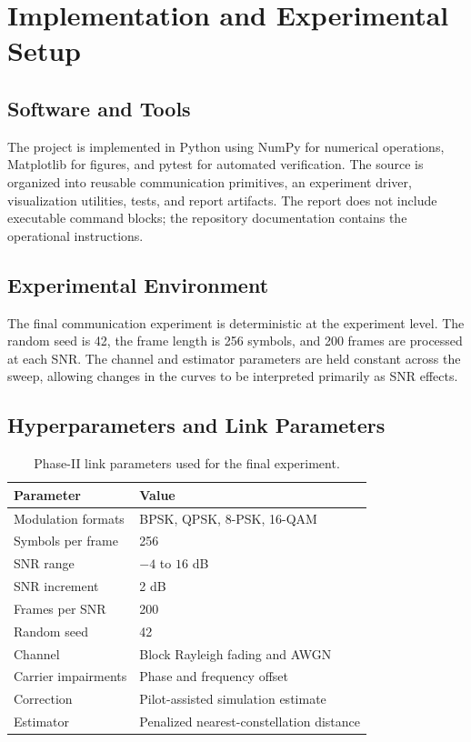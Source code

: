 \documentclass[12pt,twoside,openright]{report}
\begin{document}
\chapter{Implementation and Experimental Setup}

\section{Software and Tools}
The project is implemented in Python using NumPy for numerical operations,
Matplotlib for figures, and pytest for automated verification. The source is organized into reusable
communication primitives, an experiment driver, visualization utilities,
tests, and report artifacts. The report does not include executable command
blocks; the repository documentation contains the operational instructions.

\section{Experimental Environment}
The final communication experiment is deterministic at the experiment level.
The random seed is 42, the frame length is 256 symbols, and 200 frames are
processed at each SNR. The channel and estimator parameters are held
constant across the sweep, allowing changes in the curves to be interpreted
primarily as SNR effects.

\section{Hyperparameters and Link Parameters}
\begin{table}[htbp]
\centering
\small
\caption{Phase-II link parameters used for the final experiment.}
\label{tab:hyperparameters}
\begin{tabular}{p{} p{}}
\toprule
\textbf{Parameter} & \textbf{Value}\\
\midrule
Modulation formats & BPSK, QPSK, 8-PSK, 16-QAM\\
Symbols per frame & 256\\
SNR range & $-4$ to $16$ dB\\
SNR increment & 2 dB\\
Frames per SNR & 200\\
Random seed & 42\\
Channel & Block Rayleigh fading and AWGN\\
Carrier impairments & Phase and frequency offset\\
Correction & Pilot-assisted simulation estimate\\
Estimator & Penalized nearest-constellation distance\\
\bottomrule
\end{tabular}
\end{table}
\end{document}
